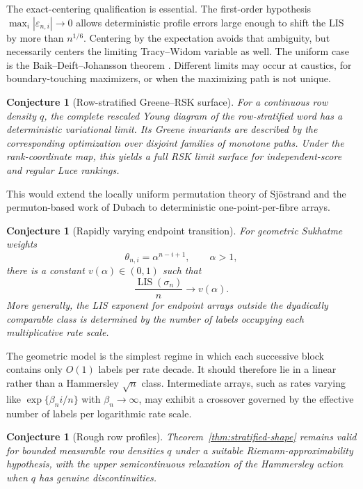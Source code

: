 \documentclass[11pt]{article}
\newtheorem{conjecture}[theorem]{Conjecture}
\theoremstyle{remark}
\newcommand{\LIS}{\operatorname{LIS}}
\newcommand{\eps}{\varepsilon}
\begin{document}
The exact-centering qualification is essential.  The first-order hypothesis
$\max_i|\eps_{n,i}|\to0$ allows deterministic profile errors large enough to
shift the LIS by more than $n^{1/6}$.  Centering by the expectation avoids
that ambiguity, but necessarily centers the limiting Tracy--Widom variable as
well.  The uniform case is the Baik--Deift--Johansson theorem
\cite{BaikDeiftJohansson1999}.  Different limits may occur at caustics, for
boundary-touching maximizers, or when the maximizing path is not unique.

\begin{conjecture}[Row-stratified Greene--RSK surface]
\label{conj:RSK-surface}
For a continuous row density $q$, the complete rescaled Young diagram of the
row-stratified word has a deterministic variational limit.  Its Greene
invariants are described by the corresponding optimization over disjoint
families of monotone paths.  Under the rank-coordinate map, this yields a full
RSK limit surface for independent-score and regular Luce rankings.
\end{conjecture}

This would extend the locally uniform permutation theory of Sj\"ostrand
\cite{Sjostrand2023} and the permuton-based work of Dubach
\cite{Dubach2023,Dubach2024} to deterministic one-point-per-fibre arrays.

\begin{conjecture}[Rapidly varying endpoint transition]
\label{conj:rapid-endpoint}
For geometric Sukhatme weights
\[
        \theta_{n,i}=\alpha^{n-i+1},\qquad \alpha>1,
\]
there is a constant $v(\alpha)\in(0,1)$ such that
\[
        \frac{\LIS(\sigma_n)}n\longrightarrow v(\alpha).
\]
More generally, the LIS exponent for endpoint arrays outside the dyadically
comparable class is determined by the number of labels occupying each
multiplicative rate scale.
\end{conjecture}

The geometric model is the simplest regime in which each successive block
contains only $O(1)$ labels per rate decade.  It should therefore lie in a
linear rather than a Hammersley $\sqrt n$ class.  Intermediate arrays, such as
rates varying like $\exp\{\beta_n i/n\}$ with $\beta_n\to\infty$, may exhibit
a crossover governed by the effective number of labels per logarithmic rate
scale.

\begin{conjecture}[Rough row profiles]
\label{conj:rough-q}
Theorem~\ref{thm:stratified-shape} remains valid for bounded measurable row
densities $q$ under a suitable Riemann-approximability hypothesis, with the
upper semicontinuous relaxation of the Hammersley action when $q$ has genuine
discontinuities.
\end{conjecture}
\end{document}
